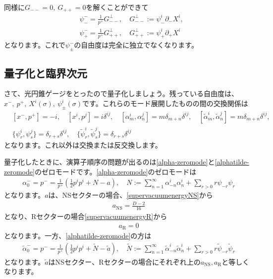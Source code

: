 \documentclass[report,paper=a4, fontsize=12pt, line_length=16cm, number_of_lines=34,dvipdfmx]{jlreq}
\numberwithin{equation}{chapter}
\numberwithin{equation}{section}
\newcommand{\del}{\partial}
\newcommand{\alphat}{\tilde{\alpha}}
\newcommand{\Nt}{\widetilde{N}}
\newcommand{\at}{\tilde{a}}
\newcommand{\psit}{\tilde{\psi}}
\newcommand{\aNS}{a_{\mathrm{NS}}}
\newcommand{\aR}{a_{\mathrm{R}}}
\begin{document}
同様に$G_{--}=0,\ G_{++}=0$を解くことができて
\begin{align}
  &\psi_{-}^{-}=\frac{1}{p^+}G^{\perp}_{--},\quad G^{\perp}_{--}:=\psi^{i}_{-}\del_{-}X^{i}
  ,\\
  &\psi_{+}^{-}=\frac{1}{p^+}G^{\perp}_{++},\quad G^{\perp}_{++}:=\psi^{i}_{+}\del_{+}X^{i}
\end{align}
となります。これで$\psi_{\pm}^{-}$の自由度は完全に独立でなくなります。

\subsection{量子化と臨界次元}
さて、光円錐ゲージをとったので量子化しましょう。残っている自由度は、$x^{-},\ p^{+},\ X^{i}(\sigma),\ \psi^{i}_{\pm}(\sigma)$です。これらのモード展開したものの間の交換関係は
\begin{align}
  &[x^{-},p^{+}]=-i,\quad[x^{i},p^{j}]=i\delta^{ij},\quad
  [\alpha_{m}^{i},\alpha_{n}^{j}]=m\delta_{m+n}\delta^{ij},\quad
  [\alphat_{m}^{i},\alphat_{n}^{j}]=m\delta_{m+n}\delta^{ij},\nonumber\\
  &\{\psi^{i}_{r},\psi^{j}_{s}\}=\delta_{r+s}\delta^{ij},\quad
  \{\psit^{i}_{r},\psit^{j}_{s}\}=\delta_{r+s}\delta^{ij}
\end{align}
となります。これ以外は交換または反交換します。

量子化したときに、演算子順序の問題が出るのは\eqref{alpha-zeromode}と\eqref{alphatilde-zeromode}のゼロモードです。\eqref{alpha-zeromode}のゼロモードは
\begin{align}
  \alpha^{-}_{0}=p^{-}=\frac{1}{p^{+}}\left(\frac12 p^{i}p^{i}+N-a  \right),\quad N:=\sum_{n=1}^{\infty}\alpha_{-n}^{i}\alpha_{n}^{i}+\sum_{r>0}r\psi_{-r}\psi_{r}\label{alpha-zeromode2}
\end{align}
となります。$a$は、NSセクターの場合、\eqref{supervacuumenergyNS}から
\begin{align}
  \aNS=\frac{D-2}{16}
\end{align}
となり、Rセクターの場合\eqref{supervacuumenergyR}から
\begin{align}
  \aR=0
\end{align}
となります。一方、\eqref{alphatilde-zeromode}の方は
\begin{align}
  \alphat^{-}_{0}=p^{-}=\frac{1}{p^{+}}\left(\frac12 p^{i}p^{i}+\Nt-\at  \right),\quad \Nt:=\sum_{n=1}^{\infty}\alphat_{-n}^{i}\alphat_{n}^{i}+\sum_{r>0}r\psit_{-r}\psit_{r}\label{alphatilde-zeromode2}
\end{align}
となります。$\at$はNSセクター、Rセクターの場合にそれぞれ上の$\aNS,\aR$と等しくなります。
\end{document}
